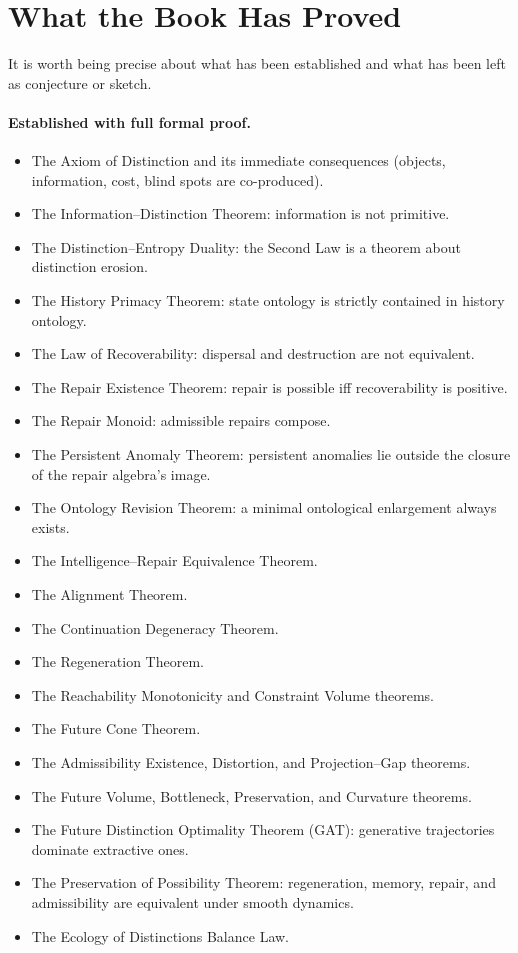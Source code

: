 \documentclass[12pt,twoside,openright]{book}
\begin{document}
\section{What the Book Has Proved}
\label{sec:ch30-proved}

It is worth being precise about what has been established
and what has been left as conjecture or sketch.

\paragraph{Established with full formal proof.}
\begin{itemize}
  \item The Axiom of Distinction and its immediate
        consequences (objects, information, cost, blind
        spots are co-produced).
  \item The Information--Distinction Theorem:
        information is not primitive.
  \item The Distinction--Entropy Duality: the Second Law
        is a theorem about distinction erosion.
  \item The History Primacy Theorem: state ontology is
        strictly contained in history ontology.
  \item The Law of Recoverability: dispersal and
        destruction are not equivalent.
  \item The Repair Existence Theorem: repair is possible
        iff recoverability is positive.
  \item The Repair Monoid: admissible repairs compose.
  \item The Persistent Anomaly Theorem: persistent
        anomalies lie outside the closure of the repair
        algebra's image.
  \item The Ontology Revision Theorem: a minimal
        ontological enlargement always exists.
  \item The Intelligence--Repair Equivalence Theorem.
  \item The Alignment Theorem.
  \item The Continuation Degeneracy Theorem.
  \item The Regeneration Theorem.
  \item The Reachability Monotonicity and
        Constraint Volume theorems.
  \item The Future Cone Theorem.
  \item The Admissibility Existence, Distortion,
        and Projection--Gap theorems.
  \item The Future Volume, Bottleneck, Preservation,
        and Curvature theorems.
  \item The Future Distinction Optimality Theorem
        (GAT): generative trajectories dominate
        extractive ones.
  \item The Preservation of Possibility Theorem:
        regeneration, memory, repair, and admissibility
        are equivalent under smooth dynamics.
  \item The Ecology of Distinctions Balance Law.
\end{itemize}
\end{document}
